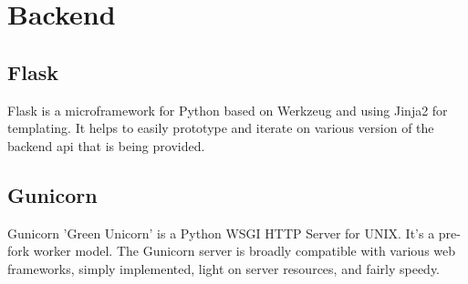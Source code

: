 \section{Backend}

\subsection{Flask}
Flask is a microframework for Python based on Werkzeug and using Jinja2 for templating. It helps to easily prototype and iterate on various version of the backend api that is being provided.

\subsection{Gunicorn}
Gunicorn 'Green Unicorn' is a Python WSGI HTTP Server for UNIX. It's a pre-fork worker model. The Gunicorn server is broadly compatible with various web frameworks, simply implemented, light on server resources, and fairly speedy.
